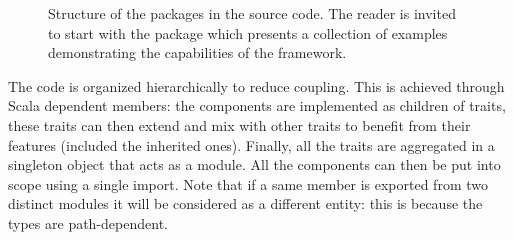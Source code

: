 \begin{figure}[hbt!]
  \centering
  \caption[Source code packages structure]{Structure of the packages in the source code. The reader is invited to start with the package  which presents a collection of examples demonstrating the capabilities of the framework.}
  \label{fig:packages}
\end{figure}

The code is organized hierarchically to reduce coupling. This is achieved through Scala dependent members: the components are implemented as children of traits, these traits can then extend and mix with other traits to benefit from their features (included the inherited ones). Finally, all the traits are aggregated in a singleton object that acts as a module. All the components can then be put into scope using a single import. Note that if a same member is exported from two distinct modules it will be considered as a different entity: this is because the types are path-dependent.
